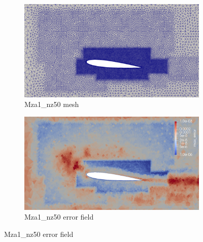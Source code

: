 \begin{figure}[H]
	\begin{subfigure}[b]{0.475\textwidth}
		\centering
		\includegraphics[width=1\textwidth]{figures/zonal_adapt_results/Mesh_and_error_plots_Re200k/Mza1_inplane.png}
		\caption{Mza1\_nz50 mesh}
		\label{fig:zonal_Mza1_mesh_Re200k}
	\end{subfigure}
	\begin{subfigure}[b]{0.475\textwidth}
		\centering
		\includegraphics[width=1\textwidth]{figures/zonal_adapt_results/Mesh_and_error_plots_Re200k/Mza1_error.png}
		\caption{Mza1\_nz50 error field}
		\label{fig:zonal_Mza1_error_Re200k}
	\end{subfigure}
	

\end{figure}
